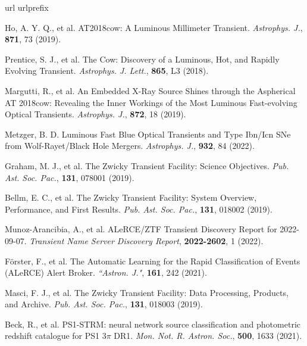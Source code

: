 \documentclass{nature_plusfigure}
\newcommand{\mn}{{Mon. Not. R. Astron. Soc.}}
\newcommand{\mnras}{\mn}
\newcommand{\aj}{{``Astron. J."}}
\newcommand{\apj}{{Astrophys. J.}}
\newcommand{\apjl}{{Astrophys. J. Lett.}}
\newcommand{\pasp}{{Pub. Ast. Soc. Pac.}}
\begin{document}
%
%

\begin{thebibliography}{100}
\expandafter\ifx\csname url\endcsname\relax
  \def\url#1{\texttt{#1}}\fi
\expandafter\ifx\csname urlprefix\endcsname\relax\def\urlprefix{URL }\fi
\providecommand{\bibinfo}[2]{#2}
\providecommand{\eprint}[2][]{\url{#2}}


 Ho, A. Y. Q., et al. AT2018cow: A Luminous Millimeter Transient. \emph{\apj}, \textbf{871}, 73 (2019). 

 Prentice, S. J., et al. The Cow: Discovery of a Luminous, Hot, and Rapidly Evolving Transient. \emph{\apjl}, \textbf{865}, L3 (2018). 

 Margutti, R., et al. An Embedded X-Ray Source Shines through the Aspherical AT 2018cow: Revealing the Inner Workings of the Most Luminous Fast-evolving Optical Transients. \emph{\apj}, \textbf{872}, 18 (2019). 

 Metzger, B. D. Luminous Fast Blue Optical Transients and Type Ibn/Icn SNe from Wolf-Rayet/Black Hole Mergers. \emph{\apj}, \textbf{932}, 84 (2022). 

 Graham, M. J., et al. The Zwicky Transient Facility: Science Objectives. \emph{\pasp}, \textbf{131}, 078001 (2019). 

 Bellm, E. C., et al. The Zwicky Transient Facility: System Overview, Performance, and First Results. \emph{\pasp}, \textbf{131}, 018002 (2019). 

 Munoz-Arancibia, A., et al. ALeRCE/ZTF Transient Discovery Report for 2022-09-07. \emph{Transient Name Server Discovery Report}, \textbf{2022-2602}, 1 (2022). 

 Förster, F., et al. The Automatic Learning for the Rapid Classification of Events (ALeRCE) Alert Broker. \emph{\aj}, \textbf{161}, 242 (2021). 

 Masci, F. J., et al. The Zwicky Transient Facility: Data Processing, Products, and Archive. \emph{\pasp}, \textbf{131}, 018003 (2019). 

 Beck, R., et al. PS1-STRM: neural network source classification and photometric redshift catalogue for PS1 3$\pi$ DR1. \emph{\mnras}, \textbf{500}, 1633 (2021). 


\end{thebibliography}
\end{document}
